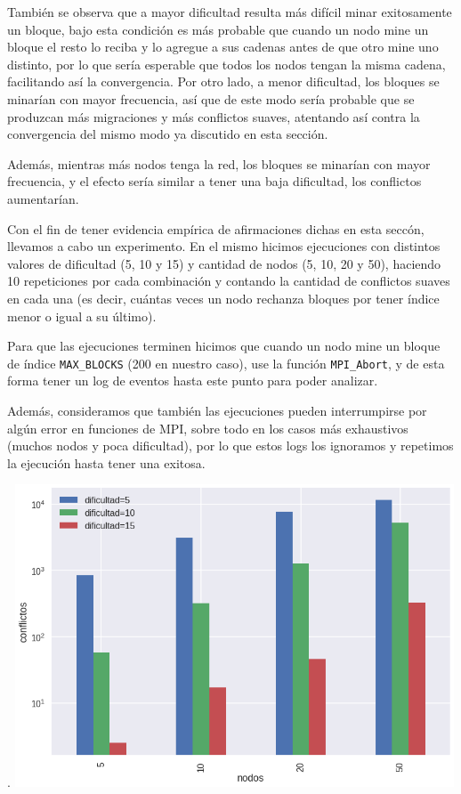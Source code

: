 \documentclass[10pt, a4paper, hidelinks]{article}
\begin{document}
También se observa que a mayor dificultad resulta más difícil minar exitosamente un bloque, bajo esta condición es más probable que cuando un nodo mine un bloque el resto lo reciba y lo agregue a sus cadenas antes de que otro mine uno distinto, por lo que sería esperable que todos los nodos tengan la misma cadena, facilitando así la convergencia. Por otro lado, a menor dificultad, los bloques se minarían con mayor frecuencia, así que de este modo sería probable que se produzcan más migraciones y más conflictos suaves, atentando así contra la convergencia del mismo modo ya discutido en esta sección.

Además, mientras más nodos tenga la red, los bloques se minarían con mayor frecuencia, y el efecto sería similar a tener una baja dificultad, los conflictos aumentarían.
 
Con el fin de tener evidencia empírica de afirmaciones dichas en esta seccón, llevamos a cabo un experimento. En el mismo hicimos ejecuciones con distintos valores de dificultad (5, 10 y 15) y cantidad de nodos (5, 10, 20 y 50), haciendo 10 repeticiones por cada combinación y contando la cantidad de conflictos suaves en cada una (es decir, cuántas veces un nodo rechanza bloques por tener índice menor o igual a su último).

Para que las ejecuciones terminen hicimos que cuando un nodo mine un bloque de índice \texttt{MAX\_BLOCKS} (200 en nuestro caso), use la función \texttt{MPI\_Abort}, y de esta forma tener un log de eventos hasta este punto para poder analizar. 

Además, consideramos que también las ejecuciones pueden interrumpirse por algún error en funciones de MPI, sobre todo en los casos más exhaustivos (muchos nodos y poca dificultad), por lo que estos logs los ignoramos y repetimos la ejecución hasta tener una exitosa.

\begin{center}.
   \includegraphics[height=9cm]{img/exp.png}
   \label{fig:exp}
\end{center}
\end{document}
